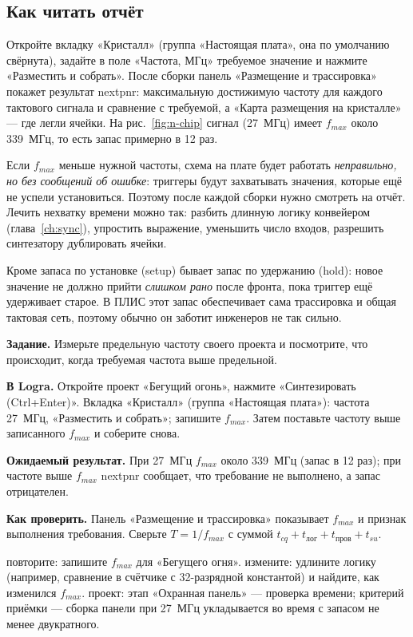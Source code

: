 \subsection{Как читать отчёт}

Откройте вкладку «Кристалл» (группа «Настоящая плата», она по умолчанию
свёрнута), задайте в поле «Частота, МГц» требуемое значение и нажмите
«Разместить и собрать». После сборки панель «Размещение и трассировка» покажет
результат nextpnr: максимальную достижимую частоту для каждого тактового
сигнала и сравнение с требуемой, а «Карта размещения на кристалле» --- где
легли ячейки. На рис.~\ref{fig:n-chip} сигнал  (27~МГц) имеет
$f_{max}$ около 339~МГц, то есть запас примерно в 12 раз.


Если $f_{max}$ меньше нужной частоты, схема на плате будет работать
\emph{неправильно, но без сообщений об ошибке}: триггеры будут
захватывать значения, которые ещё не успели установиться. Поэтому после
каждой сборки нужно смотреть на отчёт. Лечить нехватку времени можно так:
разбить длинную логику конвейером (глава~\ref{ch:sync}), упростить выражение,
уменьшить число входов, разрешить синтезатору дублировать ячейки.

\begin{infobox}
Кроме запаса по установке (setup) бывает запас по удержанию (hold): новое
значение не должно прийти \emph{слишком рано} после фронта, пока триггер ещё
удерживает старое. В ПЛИС этот запас обеспечивает сама трассировка и
общая тактовая сеть, поэтому обычно он заботит инженеров не так сильно.
\end{infobox}

\begin{diybox}
\textbf{Задание.} Измерьте предельную частоту своего проекта и посмотрите, что происходит, когда требуемая частота выше предельной.

\textbf{В Logra.} Откройте проект «Бегущий огонь», нажмите «Синтезировать (Ctrl+Enter)». Вкладка «Кристалл» (группа «Настоящая плата»): частота 27~МГц, «Разместить и собрать»; запишите $f_{max}$. Затем поставьте частоту выше записанного $f_{max}$ и соберите снова.

\textbf{Ожидаемый результат.} При 27~МГц $f_{max}$ около 339~МГц (запас в 12 раз); при частоте выше $f_{max}$ nextpnr сообщает, что требование не выполнено, а запас отрицателен.

\textbf{Как проверить.} Панель «Размещение и трассировка» показывает $f_{max}$ и признак выполнения требования. Сверьте $T=1/f_{max}$ с суммой $t_{cq}+t_{\text{лог}}+t_{\text{пров}}+t_{su}$.

 повторите: запишите $f_{max}$ для «Бегущего огня».  измените: удлините логику (например, сравнение в счётчике с 32-разрядной константой) и найдите, как изменился $f_{max}$.  проект: этап «Охранная панель» --- проверка времени; критерий приёмки --- сборка панели при 27~МГц укладывается во время с запасом не менее двукратного.
\end{diybox}

